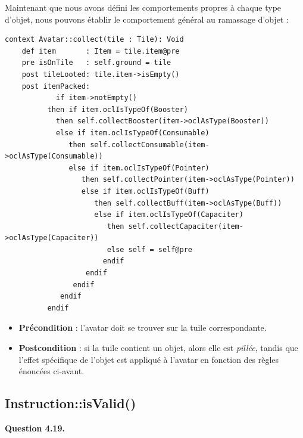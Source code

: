 \documentclass[oneside,a4paper]{book}
\begin{document}
\begin{samepage}
Maintenant que nous avons défini les comportements propres à chaque type d'objet, nous pouvons établir le comportement général au ramassage d'objet :

\begin{minipage}{\linewidth}
    \begin{lstlisting}
context Avatar::collect(tile : Tile): Void
    def item       : Item = tile.item@pre
    pre isOnTile   : self.ground = tile
    post tileLooted: tile.item->isEmpty()
    post itemPacked:
            if item->notEmpty()
          then if item.oclIsTypeOf(Booster)
            then self.collectBooster(item->oclAsType(Booster))
            else if item.oclIsTypeOf(Consumable)
               then self.collectConsumable(item->oclAsType(Consumable))
               else if item.oclIsTypeOf(Pointer)
                  then self.collectPointer(item->oclAsType(Pointer))
                  else if item.oclIsTypeOf(Buff)
                     then self.collectBuff(item->oclAsType(Buff))
                     else if item.oclIsTypeOf(Capaciter)
                        then self.collectCapaciter(item->oclAsType(Capaciter))
                        else self = self@pre
                       endif
                   endif
                endif
             endif
          endif
    \end{lstlisting}
\end{minipage}
\end{samepage}

\begin{itemize}
    \item \textbf{Précondition} : l'avatar doit se trouver sur la tuile correspondante.
    \item \textbf{Postcondition} : si la tuile contient un objet, alors elle est \textit{pillée}, tandis que l'effet spécifique de l'objet est appliqué à l'avatar en fonction des règles énoncées ci-avant.
\end{itemize}

\subsection{Instruction::isValid()}

\textbf{Question 4.19.}\label{Question 4.19.}\newline

\nopagebreak 
\end{document}
